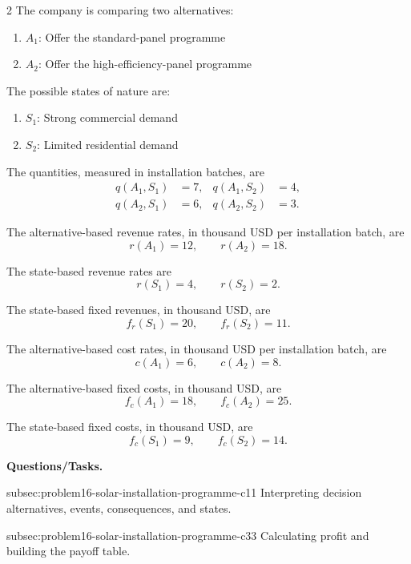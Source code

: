 \begin{multicols}{2}
	The company is comparing two alternatives:
	\begin{enumerate}[label=\arabic*.]
		\item \(A_1\): Offer the standard-panel programme
		\item \(A_2\): Offer the high-efficiency-panel programme
	\end{enumerate}
	
	The possible states of nature are:
	\begin{enumerate}[label=\arabic*.]
		\item \(S_1\): Strong commercial demand
		\item \(S_2\): Limited residential demand
	\end{enumerate}
	
	\columnbreak
	
	The quantities, measured in installation batches, are
	\[
	\begin{aligned}
		q(A_1,S_1)&=7,
		&
		q(A_1,S_2)&=4,
		\\
		q(A_2,S_1)&=6,
		&
		q(A_2,S_2)&=3.
	\end{aligned}
	\]
	
	The alternative-based revenue rates, in thousand USD per installation
	batch, are
	\[
	r(A_1)=12,
	\qquad
	r(A_2)=18.
	\]
	
	The state-based revenue rates are
	\[
	r(S_1)=4,
	\qquad
	r(S_2)=2.
	\]
	
	The state-based fixed revenues, in thousand USD, are
	\[
	f_r(S_1)=20,
	\qquad
	f_r(S_2)=11.
	\]
	
	The alternative-based cost rates, in thousand USD per installation
	batch, are
	\[
	c(A_1)=6,
	\qquad
	c(A_2)=8.
	\]
	
	The alternative-based fixed costs, in thousand USD, are
	\[
	f_c(A_1)=18,
	\qquad
	f_c(A_2)=25.
	\]
	
	The state-based fixed costs, in thousand USD, are
	\[
	f_c(S_1)=9,
	\qquad
	f_c(S_2)=14.
	\]
\end{multicols}

\textbf{Questions/Tasks.}
\begin{enumerate}
	\CriterionTask
	{subsec:problem16-solar-installation-programme-c1}{1}
	{Interpreting decision alternatives, events, consequences, and states.}

	\CriterionTask
	{subsec:problem16-solar-installation-programme-c3}{3}
	{Calculating profit and building the payoff table.}
\end{enumerate}


